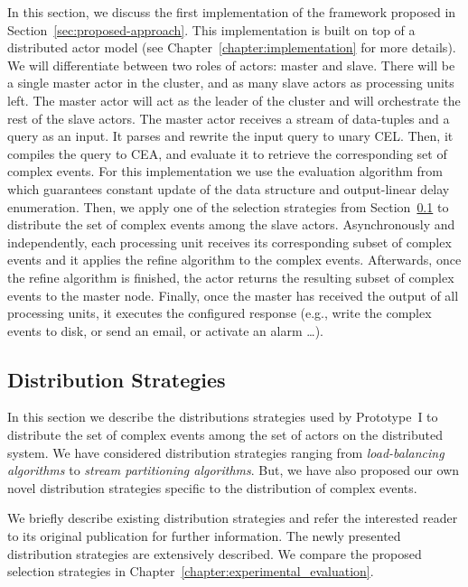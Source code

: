 In this section, we discuss the first implementation of the framework proposed in Section~\ref{sec:proposed-approach}. This implementation is built on top of a distributed actor model (see Chapter~\ref{chapter:implementation} for more details). We will differentiate between two roles of actors: master and slave. There will be a single master actor in the cluster, and as many slave actors as processing units left. The master actor will act as the leader of the cluster and will orchestrate the rest of the slave actors. The master actor receives a stream of data-tuples and a query as an input. It parses and rewrite the input query to unary CEL. Then, it compiles the query to CEA, and evaluate it to retrieve the corresponding set of complex events. For this implementation we use the evaluation algorithm from \cite{formal-framework-cer} which guarantees constant update of the data structure and output-linear delay enumeration. Then, we apply one of the selection strategies from Section~\ref{subsec:distribution-strategies} to distribute the set of complex events among the slave actors. Asynchronously and independently, each processing unit receives its corresponding subset of complex events and it applies the refine algorithm to the complex events. Afterwards, once the refine algorithm is finished, the actor returns the resulting subset of complex events to the master node. Finally, once the master has received the output of all processing units, it executes the configured response (e.g., write the complex events to disk, or send an email, or activate an alarm \ldots).

\subsection{Distribution Strategies}\label{subsec:distribution-strategies}

In this section we describe the distributions strategies used by Prototype~I to distribute the set of complex events among the set of actors on the distributed system. We have considered distribution strategies ranging from \emph{load-balancing algorithms} to \emph{stream partitioning algorithms}. But, we have also proposed our own novel distribution strategies specific to the distribution of complex events.

We briefly describe existing distribution strategies and refer the interested reader to its original publication for further information. The newly presented distribution strategies are extensively described. We compare the proposed selection strategies in Chapter~\ref{chapter:experimental_evaluation}.

